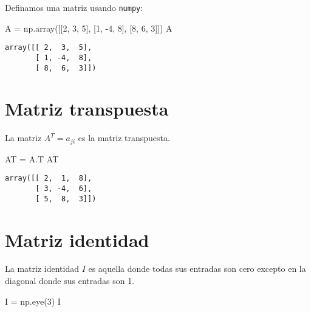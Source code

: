 \documentclass[
  letterpaper,
  DIV=11,
  numbers=noendperiod]{scrreprt}
\newenvironment{Shaded}{\begin{snugshade}}{\end{snugshade}}
\newcommand{\DecValTok}[1]{\textcolor[rgb]{0.68,0.00,0.00}{#1}}
\newcommand{\NormalTok}[1]{\textcolor[rgb]{0.00,0.23,0.31}{#1}}
\newcommand{\OperatorTok}[1]{\textcolor[rgb]{0.37,0.37,0.37}{#1}}
\begin{document}
Definamos una matriz usando \texttt{numpy}:

\begin{Shaded}
\begin{Highlighting}[]
\NormalTok{A }\OperatorTok{=}\NormalTok{ np.array([[}\DecValTok{2}\NormalTok{, }\DecValTok{3}\NormalTok{, }\DecValTok{5}\NormalTok{],}
\NormalTok{              [}\DecValTok{1}\NormalTok{, }\OperatorTok{{-}}\DecValTok{4}\NormalTok{, }\DecValTok{8}\NormalTok{],}
\NormalTok{              [}\DecValTok{8}\NormalTok{, }\DecValTok{6}\NormalTok{, }\DecValTok{3}\NormalTok{]])}
\NormalTok{A}
\end{Highlighting}
\end{Shaded}

\begin{verbatim}
array([[ 2,  3,  5],
       [ 1, -4,  8],
       [ 8,  6,  3]])
\end{verbatim}

\section{Matriz transpuesta}\label{matriz-transpuesta}

La matriz \(A^T = {a_{ji}}\) es la matriz transpuesta.

\begin{Shaded}
\begin{Highlighting}[]
\NormalTok{AT }\OperatorTok{=}\NormalTok{ A.T}
\NormalTok{AT}
\end{Highlighting}
\end{Shaded}

\begin{verbatim}
array([[ 2,  1,  8],
       [ 3, -4,  6],
       [ 5,  8,  3]])
\end{verbatim}

\section{Matriz identidad}\label{matriz-identidad}

La matriz identidad \(I\) es aquella donde todas sus entradas son cero
excepto en la diagonal donde sus entradas son 1.

\begin{Shaded}
\begin{Highlighting}[]
\NormalTok{I }\OperatorTok{=}\NormalTok{ np.eye(}\DecValTok{3}\NormalTok{)}
\NormalTok{I}
\end{Highlighting}
\end{Shaded}
\end{document}
